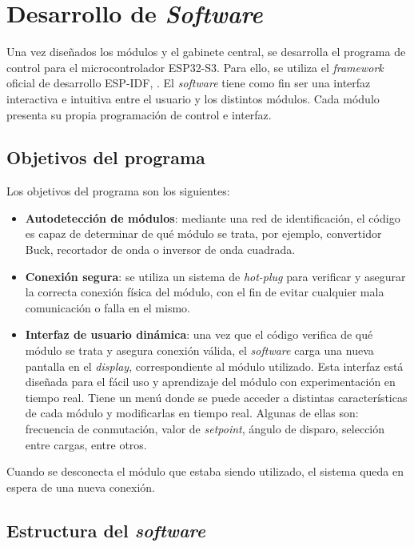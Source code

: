 \section{Desarrollo de \textit{Software}}

Una vez diseñados los módulos y el gabinete central, se desarrolla el programa de control para el microcontrolador ESP32-S3. Para ello, se utiliza el \textit{framework} oficial de desarrollo ESP-IDF, \parencite{esp_idf}. El \textit{software} tiene como fin ser una interfaz interactiva e intuitiva entre el usuario y los distintos módulos. Cada módulo presenta su propia programación de control e interfaz. 

\subsection{Objetivos del programa}

Los objetivos del programa son los siguientes:

\begin{itemize}[noitemsep]
    \item \textbf{Autodetección de módulos}: mediante una red de identificación, el código es capaz de determinar de qué módulo se trata, por ejemplo, convertidor Buck, recortador de onda o inversor de onda cuadrada.
    \item \textbf{Conexión segura}: se utiliza un sistema de \textit{hot-plug} para verificar y asegurar la correcta conexión física del módulo, con el fin de evitar cualquier mala comunicación o falla en el mismo.
    \item \textbf{Interfaz de usuario dinámica}: una vez que el código verifica de qué módulo se trata y asegura conexión válida, el \textit{software} carga una nueva pantalla en el \textit{display}, correspondiente al módulo utilizado. Esta interfaz está diseñada para el fácil uso y aprendizaje del módulo con experimentación en tiempo real. Tiene un menú donde se puede acceder a distintas características de cada módulo y modificarlas en tiempo real. Algunas de ellas son: frecuencia de conmutación, valor de \textit{setpoint}, ángulo de disparo, selección entre cargas, entre otros.
\end{itemize}

Cuando se desconecta el módulo que estaba siendo utilizado, el sistema queda en espera de una nueva conexión.

\subsection{Estructura del \textit{software}}

